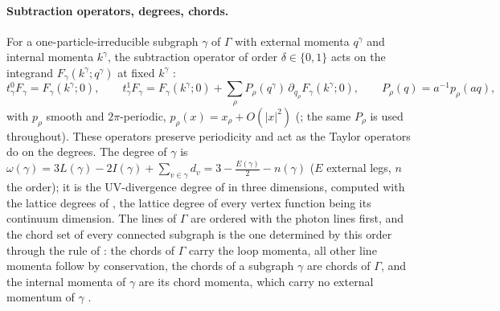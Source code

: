 \paragraph{Subtraction operators, degrees, chords.} For a one-particle-irreducible subgraph $\gamma$ of $\Gamma$ with external momenta $q^\gamma$ and internal momenta $k^\gamma$, the subtraction operator of order $\delta\in\{0,1\}$ acts on the integrand $F_\gamma(k^\gamma;q^\gamma)$ at fixed $k^\gamma$ \cite[Def.~3.1]{Rei88b}:
\[
t^0_\gamma F_\gamma=F_\gamma(k^\gamma;0),\qquad t^1_\gamma F_\gamma=F_\gamma(k^\gamma;0)+\sum_\rho P_\rho(q^\gamma)\,\partial_{q_\rho}F_\gamma(k^\gamma;0),\qquad P_\rho(q)=a^{-1}p_\rho(aq),
\]
with $p_\rho$ smooth and $2\pi$-periodic, $p_\rho(x)=x_\rho+O(|x|^2)$ (\cite[Def.~3.1, (3-2), and App.~A]{Rei88b}; the same $P_\rho$ is used throughout). These operators preserve periodicity and act as the Taylor operators do on the degrees. The degree of $\gamma$ is $\omega(\gamma)=3L(\gamma)-2I(\gamma)+\sum_{v\in\gamma}d_v=3-\frac{E(\gamma)}2-n(\gamma)$ ($E$ external legs, $n$ the order); it is the UV-divergence degree of \cite[(2-28)--(2-30)]{Rei88b} in three dimensions, computed with the lattice degrees of \cite[Defs.~2.2--2.3]{Rei88}, the lattice degree of every vertex function being its continuum dimension. The lines of $\Gamma$ are ordered with the photon lines first, and the chord set of every connected subgraph is the one determined by this order through the rule of \cite[(2-24)]{Rei88b}: the chords of $\Gamma$ carry the loop momenta, all other line momenta follow by conservation, the chords of a subgraph $\gamma$ are chords of $\Gamma$, and the internal momenta of $\gamma$ are its chord momenta, which carry no external momentum of $\gamma$ \cite[(2-16)]{Rei88b}.

